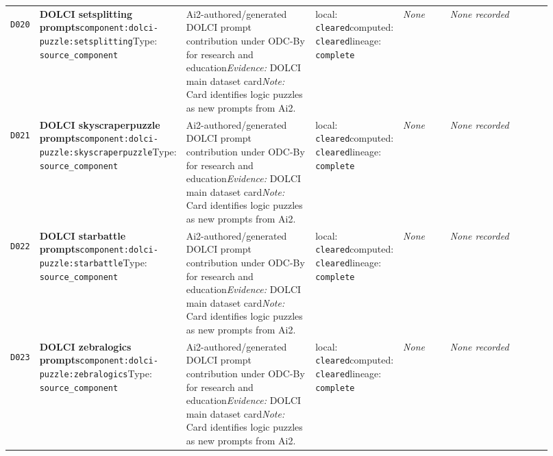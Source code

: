 \documentclass[9pt,a4paper]{article}
\newcommand{\depid}[1]{\hypertarget{dep:#1}{\texttt{#1}}}
\begin{document}
\begin{landscape}
\begin{longtable}{@{}L{0.035\linewidth}L{0.185\linewidth}L{0.27\linewidth}L{0.09\linewidth}L{0.10\linewidth}L{0.24\linewidth}@{}}
\depid{D020} & \textbf{DOLCI setsplitting prompts}\newline \nolinkurl{component:dolci-puzzle:setsplitting}\newline Type: \texttt{source\_component} & Ai2-authored/generated DOLCI prompt contribution under ODC-By for research and education\newline \textit{Evidence:} DOLCI main dataset card\newline \textit{Note:} Card identifies logic puzzles as new prompts from Ai2. & local: \texttt{cleared}\newline computed: \texttt{cleared}\newline lineage: \texttt{complete} & \textit{None} & \textit{None recorded} \\
\depid{D021} & \textbf{DOLCI skyscraperpuzzle prompts}\newline \nolinkurl{component:dolci-puzzle:skyscraperpuzzle}\newline Type: \texttt{source\_component} & Ai2-authored/generated DOLCI prompt contribution under ODC-By for research and education\newline \textit{Evidence:} DOLCI main dataset card\newline \textit{Note:} Card identifies logic puzzles as new prompts from Ai2. & local: \texttt{cleared}\newline computed: \texttt{cleared}\newline lineage: \texttt{complete} & \textit{None} & \textit{None recorded} \\
\depid{D022} & \textbf{DOLCI starbattle prompts}\newline \nolinkurl{component:dolci-puzzle:starbattle}\newline Type: \texttt{source\_component} & Ai2-authored/generated DOLCI prompt contribution under ODC-By for research and education\newline \textit{Evidence:} DOLCI main dataset card\newline \textit{Note:} Card identifies logic puzzles as new prompts from Ai2. & local: \texttt{cleared}\newline computed: \texttt{cleared}\newline lineage: \texttt{complete} & \textit{None} & \textit{None recorded} \\
\depid{D023} & \textbf{DOLCI zebralogics prompts}\newline \nolinkurl{component:dolci-puzzle:zebralogics}\newline Type: \texttt{source\_component} & Ai2-authored/generated DOLCI prompt contribution under ODC-By for research and education\newline \textit{Evidence:} DOLCI main dataset card\newline \textit{Note:} Card identifies logic puzzles as new prompts from Ai2. & local: \texttt{cleared}\newline computed: \texttt{cleared}\newline lineage: \texttt{complete} & \textit{None} & \textit{None recorded} \\

\end{longtable}
\end{landscape}
\end{document}
